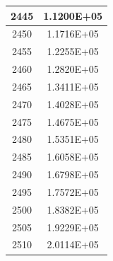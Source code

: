 \documentclass[a4paper]{article}
\begin{document}
\begin{tabular}{|c|c|}
		\hline
		2445 & 1.1200E+05 \\
		\hline
		2450 & 1.1716E+05 \\
		\hline
		2455 & 1.2255E+05 \\
		\hline
		2460 & 1.2820E+05 \\
		\hline
		2465 & 1.3411E+05 \\
		\hline
		2470 & 1.4028E+05 \\
		\hline
		2475 & 1.4675E+05 \\
		\hline
		2480 & 1.5351E+05 \\
		\hline
		2485 & 1.6058E+05 \\
		\hline
		2490 & 1.6798E+05 \\
		\hline
		2495 & 1.7572E+05 \\
		\hline
		2500 & 1.8382E+05 \\
		\hline
		2505 & 1.9229E+05 \\
		\hline
		2510 & 2.0114E+05 \\
		\hline
	\end{tabular}
	\hfill
\end{document}
